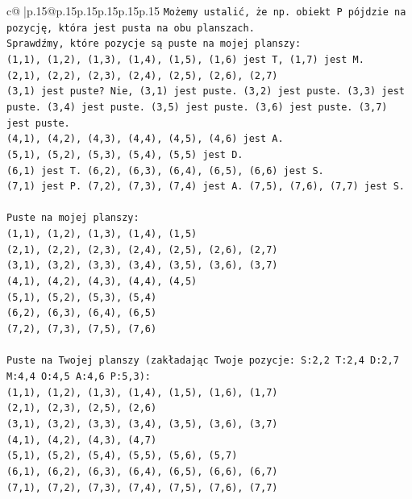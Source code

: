 \documentclass{article}
\begin{document}
{\begin{supertabular}{c@{$\;$}|p{.15\linewidth}@{}p{.15\linewidth}p{.15\linewidth}p{.15\linewidth}p{.15\linewidth}p{.15\linewidth}}
{{{\texttt{Możemy ustalić, że np. obiekt P pójdzie na pozycję, która jest pusta na obu planszach.} \\
\texttt{Sprawdźmy, które pozycje są puste na mojej planszy:} \\
\texttt{(1,1), (1,2), (1,3), (1,4), (1,5), (1,6) jest T, (1,7) jest M.} \\
\texttt{(2,1), (2,2), (2,3), (2,4), (2,5), (2,6), (2,7)} \\
\texttt{(3,1) jest puste? Nie, (3,1) jest puste. (3,2) jest puste. (3,3) jest puste. (3,4) jest puste. (3,5) jest puste. (3,6) jest puste. (3,7) jest puste.} \\
\texttt{(4,1), (4,2), (4,3), (4,4), (4,5), (4,6) jest A.} \\
\texttt{(5,1), (5,2), (5,3), (5,4), (5,5) jest D.} \\
\texttt{(6,1) jest T. (6,2), (6,3), (6,4), (6,5), (6,6) jest S.} \\
\texttt{(7,1) jest P. (7,2), (7,3), (7,4) jest A. (7,5), (7,6), (7,7) jest S.} \\
\\ 
\texttt{Puste na mojej planszy:} \\
\texttt{(1,1), (1,2), (1,3), (1,4), (1,5)} \\
\texttt{(2,1), (2,2), (2,3), (2,4), (2,5), (2,6), (2,7)} \\
\texttt{(3,1), (3,2), (3,3), (3,4), (3,5), (3,6), (3,7)} \\
\texttt{(4,1), (4,2), (4,3), (4,4), (4,5)} \\
\texttt{(5,1), (5,2), (5,3), (5,4)} \\
\texttt{(6,2), (6,3), (6,4), (6,5)} \\
\texttt{(7,2), (7,3), (7,5), (7,6)} \\
\\ 
\texttt{Puste na Twojej planszy (zakładając Twoje pozycje: S:2,2 T:2,4 D:2,7 M:4,4 O:4,5 A:4,6 P:5,3):} \\
\texttt{(1,1), (1,2), (1,3), (1,4), (1,5), (1,6), (1,7)} \\
\texttt{(2,1), (2,3), (2,5), (2,6)} \\
\texttt{(3,1), (3,2), (3,3), (3,4), (3,5), (3,6), (3,7)} \\
\texttt{(4,1), (4,2), (4,3), (4,7)} \\
\texttt{(5,1), (5,2), (5,4), (5,5), (5,6), (5,7)} \\
\texttt{(6,1), (6,2), (6,3), (6,4), (6,5), (6,6), (6,7)} \\
\texttt{(7,1), (7,2), (7,3), (7,4), (7,5), (7,6), (7,7)} \\
}}}
\end{supertabular}}
\end{document}

